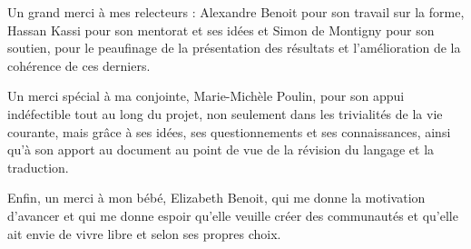Un grand merci à mes relecteurs :  Alexandre Benoit pour son travail sur la forme, Hassan Kassi pour son mentorat et ses idées et Simon de Montigny pour son soutien, pour le peaufinage de la présentation des résultats et l'amélioration de la cohérence de ces derniers.

Un merci spécial à ma conjointe, Marie-Michèle Poulin, pour son appui indéfectible tout au long du projet, non seulement dans les trivialités de la vie courante, mais grâce à ses idées, ses questionnements et ses connaissances, ainsi qu'à son apport au document au point de vue de la révision du langage et la traduction. 

Enfin, un merci à mon bébé, Elizabeth Benoit, qui me donne la motivation d'avancer et qui me donne espoir qu'elle veuille créer des communautés et qu'elle ait envie de vivre libre et selon ses propres choix.


























